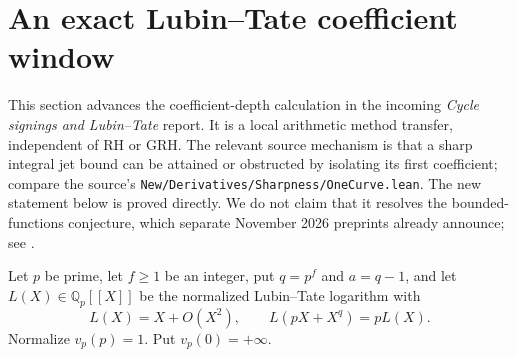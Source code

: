 \section{An exact Lubin--Tate coefficient window}
\label{sec:log-window}
This section advances the coefficient-depth calculation in the incoming
\emph{Cycle signings and Lubin--Tate} report.  It is a local arithmetic
method transfer, independent of RH or GRH.  The relevant source mechanism is
that a sharp integral jet bound can be attained or obstructed by isolating its
first coefficient; compare the source's
\texttt{New/Derivatives/Sharpness/OneCurve.lean}.  The new statement below is
proved directly.  We do not claim that it resolves the bounded-functions
conjecture, which separate November 2026 preprints already announce; see \cite{Colovic}.

Let $p$ be prime, let $f\ge1$ be an integer, put $q=p^f$ and $a=q-1$,
and let $L(X)\in\mathbb Q_p[[X]]$ be the
normalized Lubin--Tate logarithm with
\[
 L(X)=X+O(X^2),\qquad L(pX+X^q)=pL(X).
\]
Normalize $v_p(p)=1$.  Put $v_p(0)=+\infty$.

